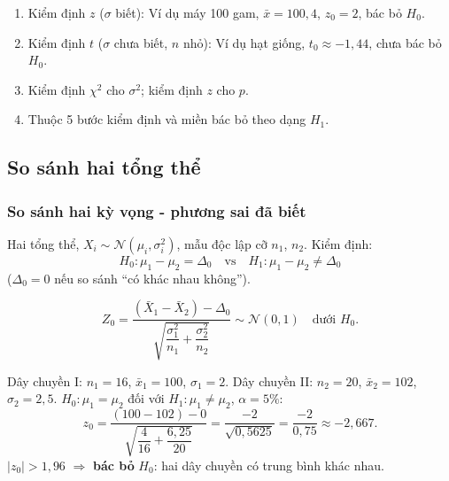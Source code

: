 \documentclass[12pt,a4paper]{article}
\begin{document}
\begin{tongket}[title={Tổng kết}]
\begin{enumerate}
  \item Kiểm định $z$ ($\sigma$ biết): Ví dụ máy 100 gam, $\bar{x}=100{,}4$, $z_0=2$, bác bỏ $H_0$.
  \item Kiểm định $t$ ($\sigma$ chưa biết, $n$ nhỏ): Ví dụ hạt giống, $t_0 \approx -1{,}44$, chưa bác bỏ $H_0$.
  \item Kiểm định $\chi^2$ cho $\sigma^2$; kiểm định $z$ cho $p$.
  \item Thuộc 5 bước kiểm định và miền bác bỏ theo dạng $H_1$.
\end{enumerate}
\end{tongket}
\subsection{So sánh hai tổng thể}

\subsubsection{So sánh hai kỳ vọng - phương sai đã biết}

\begin{dinhnghia}[title={Bài toán}]
  Hai tổng thể, $X_i \sim \mathcal{N}(\mu_i, \sigma_i^2)$, mẫu độc lập cỡ $n_1$, $n_2$. Kiểm định:
  \[
    H_0: \mu_1 - \mu_2 = \Delta_0 \quad \text{vs} \quad H_1: \mu_1 - \mu_2 \ne \Delta_0
  \]
  ($\Delta_0 = 0$ nếu so sánh ``có khác nhau không'').
\end{dinhnghia}

\begin{congthuc}[title={Tiêu chuẩn kiểm định, $\sigma_1, \sigma_2$ biết}]
  \[
    Z_0 = \dfrac{(\bar{X}_1 - \bar{X}_2) - \Delta_0}{\sqrt{\dfrac{\sigma_1^2}{n_1} + \dfrac{\sigma_2^2}{n_2}}} \sim \mathcal{N}(0,1) \quad \text{dưới } H_0.
  \]
\end{congthuc}

\begin{vidu}[title={So sánh hai dây chuyền sản xuất}]
Dây chuyền I: $n_1=16$, $\bar{x}_1=100$, $\sigma_1=2$. Dây chuyền II: $n_2=20$, $\bar{x}_2=102$, $\sigma_2=2{,}5$.
$H_0: \mu_1=\mu_2$ đối với $H_1: \mu_1 \ne \mu_2$, $\alpha=5\%$:
\[
  z_0 = \dfrac{(100-102)-0}{\sqrt{\dfrac{4}{16} + \dfrac{6{,}25}{20}}} = \dfrac{-2}{\sqrt{0{,}5625}} = \dfrac{-2}{0{,}75} \approx -2{,}667.
\]
$|z_0| > 1{,}96$ $\Rightarrow$ \textbf{bác bỏ} $H_0$: hai dây chuyền có trung bình khác nhau.
\end{vidu}
\end{document}
